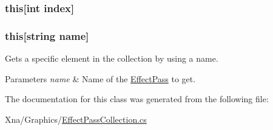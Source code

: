 \subsubsection[{this[int index]}]{ this\mbox{[}int index\mbox{]}\hspace{0.3cm}{\ttfamily [get]}}\label{classMicrosoft_1_1Xna_1_1Framework_1_1Graphics_1_1EffectPassCollection_ad734caae9f9a5c42876ae64591f37463}
\hypertarget{classMicrosoft_1_1Xna_1_1Framework_1_1Graphics_1_1EffectPassCollection_a4d81facc9f5735b8e70df32e0578c9ac}{}
\subsubsection[{this[string name]}]{ this\mbox{[}string name\mbox{]}\hspace{0.3cm}{\ttfamily [get]}}\label{classMicrosoft_1_1Xna_1_1Framework_1_1Graphics_1_1EffectPassCollection_a4d81facc9f5735b8e70df32e0578c9ac}


Gets a specific element in the collection by using a name.


\begin{DoxyParams}{Parameters}
{\em name} & Name of the \hyperlink{classMicrosoft_1_1Xna_1_1Framework_1_1Graphics_1_1EffectPass}{Effect\+Pass} to get.\\
\hline
\end{DoxyParams}


The documentation for this class was generated from the following file\+:\begin{DoxyCompactItemize}
\item 
Xna/\+Graphics/\hyperlink{EffectPassCollection_8cs}{Effect\+Pass\+Collection.\+cs}\end{DoxyCompactItemize}
